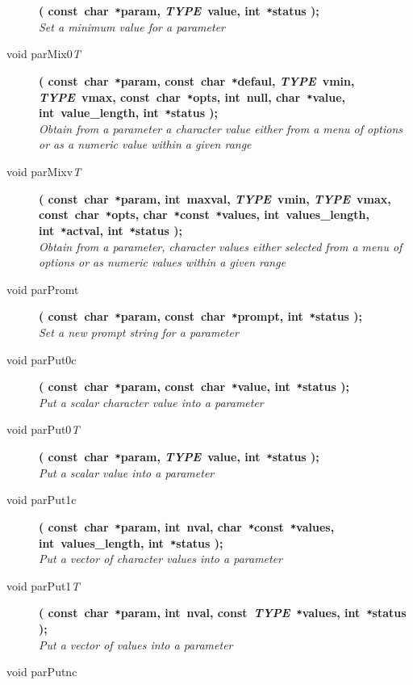 \documentclass[twoside,11pt,nolof]{starlink}
\begin{document}
\begin{flushleft}
\begin{description}
\textbf{( const~char~\texttt{*}param, \textit{TYPE}~value,
          int~\texttt{*}status );}\\
\textit{Set a minimum value for a parameter}
\item[void parMix0\textit{T}]
\textbf{( const~char~\texttt{*}param, const~char~\texttt{*}defaul,
               \textit{TYPE}~vmin, \textit{TYPE}~vmax,
               const~char~\texttt{*}opts, int~null, char~\texttt{*}value,
               int~value\_length, int~\texttt{*}status );} \\
\textit{Obtain from a parameter a character value either from a menu of
            options or as a numeric value within a given range}
\item[void parMixv\textit{T}]
\textbf{( const~char~\texttt{*}param, int~maxval, \textit{TYPE}~vmin,
               \textit{TYPE}~vmax, const~char~\texttt{*}opts,
               char~\texttt{*}const~\texttt{*}values, int~values\_length,
               int~\texttt{*}actval, int~\texttt{*}status );} \\
\textit{Obtain from a parameter, character values either selected from a
            menu of options or as numeric values within a given range}
\item[void parPromt]
\textbf{( const~char~\texttt{*}param, const~char~\texttt{*}prompt,
          int~\texttt{*}status );}\\
\textit{Set a new prompt string for a parameter}
\item[void parPut0c]
\textbf{( const~char~\texttt{*}param, const~char~\texttt{*}value,
          int~\texttt{*}status );}\\
\textit{Put a scalar character value into a parameter}
\item[void parPut0\textit{T}]
\textbf{( const~char~\texttt{*}param, \textit{TYPE}~value,
          int~\texttt{*}status );}\\
\textit{Put a scalar value into a parameter}
\item[void parPut1c]
\textbf{( const~char~\texttt{*}param, int~nval,
               char~\texttt{*}const~\texttt{*}values,  int~values\_length,
               int~\texttt{*}status );} \\
\textit{Put a vector of character values into a parameter}
\item[void parPut1\textit{T}]
\textbf{( const~char~\texttt{*}param, int~nval,
          const~\textit{TYPE}~\texttt{*}values, int~\texttt{*}status );}\\
\textit{Put a vector of values into a parameter}
\item[void parPutnc]

\end{description}
\end{flushleft}
\end{document}
